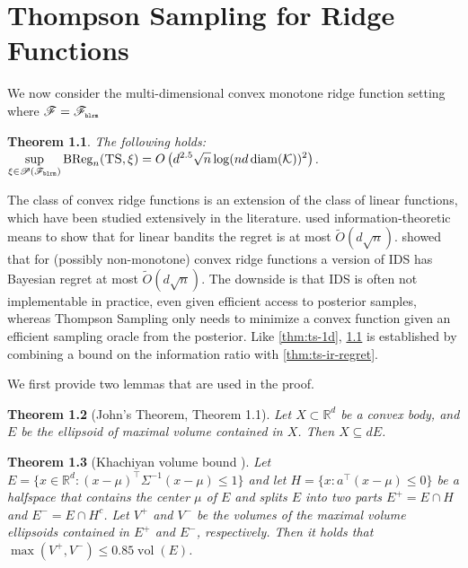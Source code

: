 \documentclass[letter, 12pt]{report}
\newcommand{\pr}{\text{\tiny\texttt{r}}}
\newcommand{\pb}{\text{\tiny\texttt{b}}}
\newcommand{\pl}{\text{\tiny\texttt{l}}}
\renewcommand{\pm}{\text{\tiny\texttt{m}}}
\newcommand{\R}{\mathbb R}
\newcommand{\BReg}{\textrm{BReg}}
\newcommand{\cK}{\mathcal K}
\newcommand{\sF}{\mathscr F}
\newcommand{\sP}{\mathscr P}
\newcommand{\vol}{\operatorname{vol}}
\newcommand{\diam}{\operatorname{diam}}
\newcommand{\1}{\mathbf{1}}
\newcommand{\ts}{\textsc{TS}\xspace}
\newcommand{\IDS}{\textsc{IDS}}
\theoremstyle{plain}
\newtheorem{theorem}{Theorem}
\theoremstyle{definition}
\theoremstyle{remark}
\begin{document}
\chapter{Thompson Sampling for Ridge Functions}
\label{chap:ridge-ts}

We now consider the multi-dimensional convex monotone ridge function setting where $\sF = \sF_{\pb\pl\pr\pm}$

\begin{theorem}\label{thm:ts-ridge}
    The following holds:
    $\displaystyle \sup_{\xi \in \sP(\sF_{\pb\pl\pr\pm})} \BReg_n(\ts, \xi) = O\left(d^{2.5} \sqrt{n} \log(n d \diam(\cK))^2\right)$.
\end{theorem}

The class of convex ridge functions is an extension of the class of linear functions, which have been studied extensively in the literature.
\cite{RV16} used information-theoretic means to show that for linear bandits the regret is at most $\tilde O(d \sqrt{n})$.
\cite{lattimore2021minimax} showed that for (possibly non-monotone) convex ridge functions a version of \IDS{} has Bayesian regret at most $\tilde O(d \sqrt{n})$.
The downside is that \IDS{} is often not implementable in practice, even given efficient access to posterior samples, whereas Thompson Sampling only needs to minimize a convex function given an efficient sampling oracle from the posterior.
Like \cref{thm:ts-1d}, \cref{thm:ts-ridge} is established by combining a bound on the information ratio with \cref{thm:ts-ir-regret}.

We first provide two lemmas that are used in the proof.
\begin{theorem}[John's Theorem, \cite{todd2016minimum} Theorem 1.1]
    \label{thm:john}
    Let $X \subset \R^d$ be a convex body, and $E$ be the ellipsoid of maximal volume contained in $X$. Then $X \subseteq d E$.
\end{theorem}
\begin{theorem}[Khachiyan volume bound \cite{khachiyan1990inequality}]\label{thm:khachiyan}
    Let $E=\{x\in\mathbb{R}^d:(x-\mu)^\top\Sigma^{-1}(x-\mu)\le1\}$ and let
    $H=\{x:a^\top(x-\mu)\le0\}$ be a halfspace
    that contains the center $\mu$ of $E$ and splits $E$ into two parts
    $E^+ = E \cap H$ and $E^- = E \cap H^c$.
    Let $V^+$ and $V^-$ be the volumes of the maximal volume ellipsoids contained in $E^+$ and $E^-$, respectively.
    Then it holds that $\max(V^+, V^-) \leq 0.85 \vol(E)$.
\end{theorem}
\end{document}
